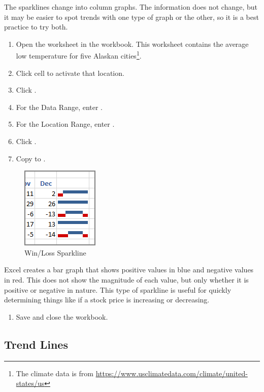 The sparklines change into column graphs. The information does not change, but it may be easier to spot trends with one type of graph or the other, so it is a best practice to try both.

\begin{enumerate}[resume]
	\item Open the  worksheet in the  workbook. This worksheet contains the average low temperature for five Alaskan cities\footnote{The climate data is from  \url{https://www.usclimatedata.com/climate/united-states/us}}.
	\item Click cell  to activate that location.
	\item Click .
	\item For the Data Range, enter .
	\item For the Location Range, enter .
	\item Click .
	\item Copy  to .
\end{enumerate}

\begin{figure}[H]
	\centering
	\includegraphics[width=\maxwidth{.50\linewidth}]{gfx/ch08_fig06}
	\caption{Win/Loss Sparkline}
	\label{08:fig06}
\end{figure}

Excel creates a bar graph that shows positive values in blue and negative values in red. This does not show the magnitude of each value, but only whether it is positive or negative in nature. This type of sparkline is useful for quickly determining things like if a stock price is increasing or decreasing.

\begin{enumerate}[resume]
	\item Save and close the  workbook.
\end{enumerate}

\subsection{Trend Lines}

